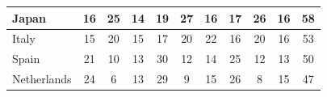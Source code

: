 \documentclass[12pt]{article}  %
\begin{document}
\begin{subappendices}
\begin{longtable}{|l|c|c|c|c|c|c|c|c|c|c|}
	\hline
	Japan                                                          & 16                                                                     & 25                                                                     & 14                                                                     & 19                                                                     & 27                                                                     & 16                                                                     & 17                        & 26                          & 16                          & 58                          \\ 
	\hline
	Italy                                                          & 15                                                                     & 20                                                                     & 15                                                                     & 17                                                                     & 20                                                                     & 22                                                                     & 16                        & 20                          & 16                          & 53                          \\ 
	\hline
	Spain                                                          & 21                                                                     & 10                                                                     & 13                                                                     & 30                                                                     & 12                                                                     & 14                                                                     & 25                        & 12                          & 13                          & 50                          \\ 
	\hline
	Netherlands                                                    & 24                                                                     & 6                                                                      & 13                                                                     & 29                                                                     & 9                                                                      & 15                                                                     & 26                        & 8                           & 15                          & 47                          \\ 

\end{longtable}
\end{subappendices}
\end{document}
